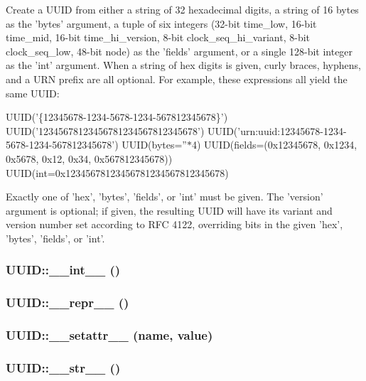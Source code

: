 Create a UUID from either a string of 32 hexadecimal digits, a string of 16 bytes as the 'bytes' argument, a tuple of six integers (32-bit time\_\-low, 16-bit time\_\-mid, 16-bit time\_\-hi\_\-version, 8-bit clock\_\-seq\_\-hi\_\-variant, 8-bit clock\_\-seq\_\-low, 48-bit node) as the 'fields' argument, or a single 128-bit integer as the 'int' argument. When a string of hex digits is given, curly braces, hyphens, and a URN prefix are all optional. For example, these expressions all yield the same UUID:

UUID('\{12345678-1234-5678-1234-567812345678\}') UUID('12345678123456781234567812345678') UUID('urn:uuid:12345678-1234-5678-1234-567812345678') UUID(bytes=''$\ast$4) UUID(fields=(0x12345678, 0x1234, 0x5678, 0x12, 0x34, 0x567812345678)) UUID(int=0x12345678123456781234567812345678)

Exactly one of 'hex', 'bytes', 'fields', or 'int' must be given. The 'version' argument is optional; if given, the resulting UUID will have its variant and version number set according to RFC 4122, overriding bits in the given 'hex', 'bytes', 'fields', or 'int'.
\subsubsection{\setlength{\rightskip}{0pt plus 5cm}UUID::\_\-\_\-int\_\-\_\- ()}\label{classUUID_UUIDa3}


\subsubsection{\setlength{\rightskip}{0pt plus 5cm}UUID::\_\-\_\-repr\_\-\_\- ()}\label{classUUID_UUIDa4}


\subsubsection{\setlength{\rightskip}{0pt plus 5cm}UUID::\_\-\_\-setattr\_\-\_\- (name, value)}\label{classUUID_UUIDa5}


\subsubsection{\setlength{\rightskip}{0pt plus 5cm}UUID::\_\-\_\-str\_\-\_\- ()}\label{classUUID_UUIDa6}


